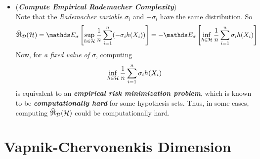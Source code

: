 \documentclass[11pt]{article}
\begin{document}
\begin{itemize}
\item \begin{remark} (\emph{\textbf{Compute Empirical Rademacher Complexity}})\\
Note that the \emph{Rademacher variable} $\sigma_i$ and $-\sigma_i$ have the same distribution. So
\begin{align*}
\widehat{\frR}_{\cD}(\cH)&= \E{\sigma}{\sup_{h \in \cH}\frac{1}{n}\sum_{i=1}^{n}(-\sigma_{i}h(X_i))} = -\E{\sigma}{\inf_{h \in \cH}\frac{1}{n}\sum_{i=1}^{n}\sigma_{i}h(X_i)}
\end{align*} Now, for \emph{a fixed value of $\sigma$}, computing 
\begin{align*}
\inf_{h \in {\mathcal H}}\frac{1}{n}\sum_{i=1}^{n}\sigma_{i}h(X_i)
\end{align*} is equivalent to an \emph{\textbf{empirical risk minimization problem}}, which is known to be \emph{\textbf{computationally hard}} for some hypothesis sets. Thus, in some cases, computing $\widehat{{\mathfrak R}}_{{\mathcal D}}({\mathcal H})$ could be computationally hard. 
\end{remark}
\end{itemize}

\section{Vapnik-Chervonenkis Dimension}
\end{document}
